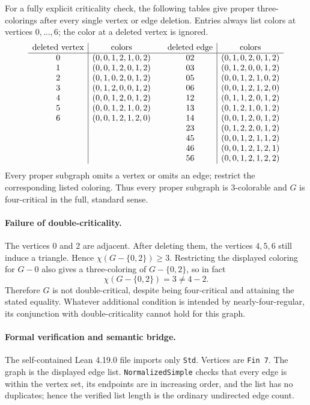 \documentclass[10pt]{article}
\begin{document}
For a fully explicit criticality check, the following tables give proper
three-colorings after every single vertex or edge deletion.
Entries always list colors at vertices $0,\ldots,6$; the color at a deleted
vertex is ignored.
\[
\begin{array}{c|c@{\qquad}c|c}
\text{deleted vertex}&\text{colors}&\text{deleted edge}&\text{colors}\\ \hline
0&(0,0,1,2,1,0,2)&02&(0,1,0,2,0,1,2)\\
1&(0,0,1,2,0,1,2)&03&(0,1,2,0,0,1,2)\\
2&(0,1,0,2,0,1,2)&05&(0,0,1,2,1,0,2)\\
3&(0,1,2,0,0,1,2)&06&(0,0,1,2,1,2,0)\\
4&(0,0,1,2,0,1,2)&12&(0,1,1,2,0,1,2)\\
5&(0,0,1,2,1,0,2)&13&(0,1,2,1,0,1,2)\\
6&(0,0,1,2,1,2,0)&14&(0,0,1,2,0,1,2)\\
&&23&(0,1,2,2,0,1,2)\\
&&45&(0,0,1,2,1,1,2)\\
&&46&(0,0,1,2,1,2,1)\\
&&56&(0,0,1,2,1,2,2)
\end{array}
\]
Every proper subgraph omits a vertex or omits an edge; restrict the
corresponding listed coloring. Thus every proper subgraph is $3$-colorable
and $G$ is four-critical in the full, standard sense.

\paragraph{Failure of double-criticality.}
The vertices $0$ and $2$ are adjacent. After deleting them, the vertices
$4,5,6$ still induce a triangle. Hence
$\chi(G-\{0,2\})\ge3$.
Restricting the displayed coloring for $G-0$ also gives a three-coloring
of $G-\{0,2\}$, so in fact
\[
 \chi(G-\{0,2\})=3\ne4-2.
\]
Therefore $G$ is not double-critical, despite being four-critical and
attaining the stated equality. Whatever additional condition is intended
by nearly-four-regular, its conjunction with double-criticality cannot
hold for this graph.

\paragraph{Formal verification and semantic bridge.}
The self-contained Lean 4.19.0 file imports only \texttt{Std}.
Vertices are \texttt{Fin 7}. The graph is the displayed edge list.
\texttt{NormalizedSimple} checks that every edge is within the vertex set,
its endpoints are in increasing order, and the list has no duplicates;
hence the verified list length is the ordinary undirected edge count.
\end{document}
